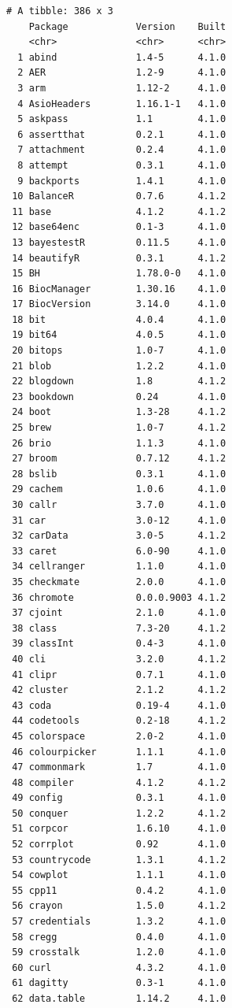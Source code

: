 \documentclass[
  a4paper,
  pandoc,
  ja=standard,
  jafont=haranoaji]{bxjsbook}
\begin{document}
\begin{verbatim}
# A tibble: 386 x 3
    Package            Version    Built
    <chr>              <chr>      <chr>
  1 abind              1.4-5      4.1.0
  2 AER                1.2-9      4.1.0
  3 arm                1.12-2     4.1.0
  4 AsioHeaders        1.16.1-1   4.1.0
  5 askpass            1.1        4.1.0
  6 assertthat         0.2.1      4.1.0
  7 attachment         0.2.4      4.1.0
  8 attempt            0.3.1      4.1.0
  9 backports          1.4.1      4.1.0
 10 BalanceR           0.7.6      4.1.2
 11 base               4.1.2      4.1.2
 12 base64enc          0.1-3      4.1.0
 13 bayestestR         0.11.5     4.1.0
 14 beautifyR          0.3.1      4.1.2
 15 BH                 1.78.0-0   4.1.0
 16 BiocManager        1.30.16    4.1.0
 17 BiocVersion        3.14.0     4.1.0
 18 bit                4.0.4      4.1.0
 19 bit64              4.0.5      4.1.0
 20 bitops             1.0-7      4.1.0
 21 blob               1.2.2      4.1.0
 22 blogdown           1.8        4.1.2
 23 bookdown           0.24       4.1.0
 24 boot               1.3-28     4.1.2
 25 brew               1.0-7      4.1.2
 26 brio               1.1.3      4.1.0
 27 broom              0.7.12     4.1.2
 28 bslib              0.3.1      4.1.0
 29 cachem             1.0.6      4.1.0
 30 callr              3.7.0      4.1.0
 31 car                3.0-12     4.1.0
 32 carData            3.0-5      4.1.2
 33 caret              6.0-90     4.1.0
 34 cellranger         1.1.0      4.1.0
 35 checkmate          2.0.0      4.1.0
 36 chromote           0.0.0.9003 4.1.2
 37 cjoint             2.1.0      4.1.0
 38 class              7.3-20     4.1.2
 39 classInt           0.4-3      4.1.0
 40 cli                3.2.0      4.1.2
 41 clipr              0.7.1      4.1.0
 42 cluster            2.1.2      4.1.2
 43 coda               0.19-4     4.1.0
 44 codetools          0.2-18     4.1.2
 45 colorspace         2.0-2      4.1.0
 46 colourpicker       1.1.1      4.1.0
 47 commonmark         1.7        4.1.0
 48 compiler           4.1.2      4.1.2
 49 config             0.3.1      4.1.0
 50 conquer            1.2.2      4.1.2
 51 corpcor            1.6.10     4.1.0
 52 corrplot           0.92       4.1.0
 53 countrycode        1.3.1      4.1.2
 54 cowplot            1.1.1      4.1.0
 55 cpp11              0.4.2      4.1.0
 56 crayon             1.5.0      4.1.2
 57 credentials        1.3.2      4.1.0
 58 cregg              0.4.0      4.1.0
 59 crosstalk          1.2.0      4.1.0
 60 curl               4.3.2      4.1.0
 61 dagitty            0.3-1      4.1.0
 62 data.table         1.14.2     4.1.0

\end{verbatim}
\end{document}
